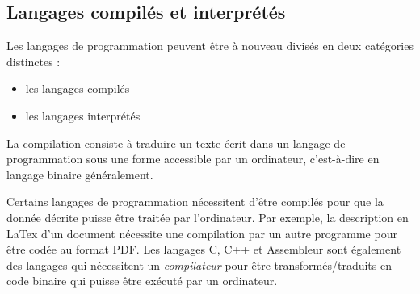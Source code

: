 \documentclass[../../main.tex]{subfiles}
\begin{document}
\subsection{Langages compilés et interprétés}
Les langages de programmation peuvent être à nouveau divisés en deux catégories distinctes :
\begin{itemize}
	\item les langages compilés
	\item les langages interprétés
\end{itemize}
La compilation consiste à traduire un texte écrit dans un langage de programmation sous une forme accessible par un ordinateur, c'est-à-dire en langage binaire généralement.

Certains langages de programmation nécessitent d'être compilés pour que la donnée décrite puisse être traitée par l'ordinateur. Par exemple, la description en LaTex d'un document nécessite une compilation par un autre programme pour être codée au format PDF. Les langages C, C++ et Assembleur sont également des langages qui nécessitent un \textit{compilateur} pour être transformés/traduits en code binaire qui puisse être exécuté par un ordinateur.
\end{document}
